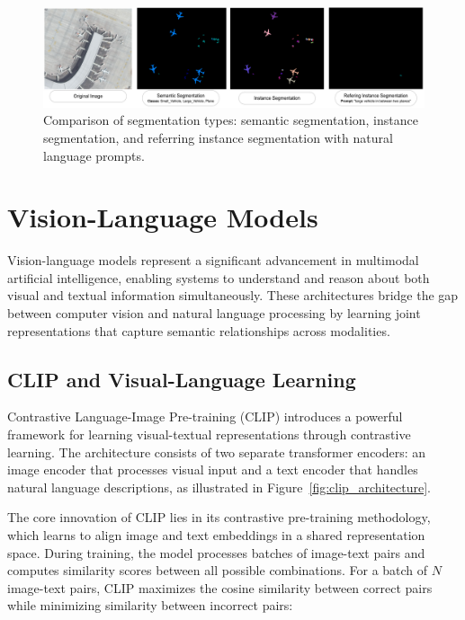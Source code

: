 \begin{figure}[htbp]
\centering
\includegraphics[width=1.0\textwidth]{Images/segmentation.png}
\caption{Comparison of segmentation types: semantic segmentation, instance segmentation, and referring instance segmentation with natural language prompts.}
\label{fig:segmentation}
\end{figure}

\section{Vision-Language Models}

Vision-language models represent a significant advancement in multimodal artificial intelligence, enabling systems to understand and reason about both visual and textual information simultaneously. These architectures bridge the gap between computer vision and natural language processing by learning joint representations that capture semantic relationships across modalities.

\subsection{CLIP and Visual-Language Learning}

Contrastive Language-Image Pre-training (CLIP) introduces a powerful framework for learning visual-textual representations through contrastive learning. The architecture consists of two separate transformer encoders: an image encoder that processes visual input and a text encoder that handles natural language descriptions, as illustrated in Figure~\ref{fig:clip_architecture}.

The core innovation of CLIP lies in its contrastive pre-training methodology, which learns to align image and text embeddings in a shared representation space. During training, the model processes batches of image-text pairs and computes similarity scores between all possible combinations. For a batch of $N$ image-text pairs, CLIP maximizes the cosine similarity between correct pairs while minimizing similarity between incorrect pairs:

